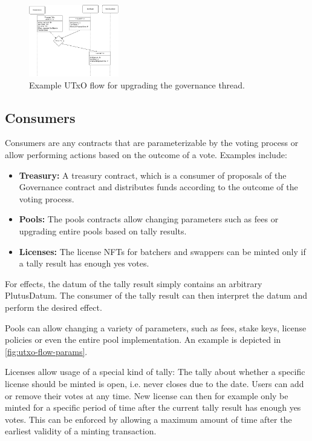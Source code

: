 \documentclass[11pt]{article}
\begin{document}
\begin{figure}
    \centering
    \includegraphics[width=0.35\textwidth]{figures/upgrade-gov-thread.pdf}
    \caption{Example UTxO flow for upgrading the governance thread.}
    \label{fig:utxo-flow-gov-thread-upgrade}
\end{figure}

\subsection{Consumers}

Consumers are any contracts that are parameterizable by the voting process or allow performing actions
based on the outcome of a vote. Examples include:

\begin{itemize}
    \item \textbf{Treasury:} A treasury contract, which is a consumer of proposals of the Governance contract and distributes funds according to the outcome of the voting process.
    \item \textbf{Pools:} The pools contracts allow changing parameters such as fees or upgrading entire pools based on tally results.
    \item \textbf{Licenses:} The license NFTs for batchers and swappers can be minted only if a tally result has enough yes votes.
\end{itemize}

For effects, the datum of the tally result simply contains an arbitrary PlutusDatum.
The consumer of the tally result can then interpret the datum and perform the desired effect.

Pools can allow changing a variety of parameters, such as fees, stake keys, license policies or even the entire pool implementation.
An example is depicted in \cref{fig:utxo-flow-params}.

Licenses allow usage of a special kind of tally: The tally about whether a specific license should be minted
is open, i.e. never closes due to the date. Users can add or remove their votes at any time.
New license can then for example only be minted for a specific period of time after the current tally result has enough yes votes.
This can be enforced by allowing a maximum amount of time after the earliest validity of a minting transaction.
\end{document}
